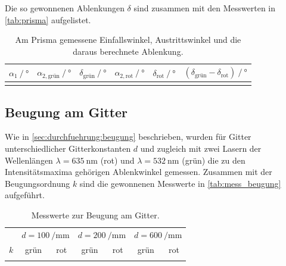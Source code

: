 Die so gewonnenen Ablenkungen $\delta$ sind zusammen mit den Messwerten in \autoref{tab:prisma} aufgelistet.

\begin{table}
  \centering
  \caption{Am Prisma gemessene Einfallswinkel, Austrittswinkel und die daraus berechnete Ablenkung.} %
  \label{tab:prisma}
  \begin{tabular}{S S S S S S}
    \toprule
    {$\alpha_1 \mathbin{/} \si{\degree}$} &
    {$\alpha_{2, \text{grün}} \mathbin{/} \si{\degree}$} &
    {$\delta_\text{grün} \mathbin{/} \si{\degree}$} &
    {$\alpha_{2, \text{rot}} \mathbin{/} \si{\degree}$} &
    {$\delta_\text{rot} \mathbin{/} \si{\degree}$} &
    {$(\delta_\text{grün} - \delta_\text{rot}) \mathbin{/} \si{\degree}$} \\
    \midrule
    \bottomrule
  \end{tabular}
\end{table}


\FloatBarrier %
\subsection{Beugung am Gitter}
\label{sec:auswertung:beugung}
Wie in \autoref{sec:durchfuehrung:beugung} beschrieben,
wurden für Gitter unterschiedlicher Gitterkonstanten $d$
und zugleich mit zwei Lasern der Wellenlängen
$\lambda = \SI{635}{\nano\meter}$ (rot) und
$\lambda = \SI{532}{\nano\meter}$ (grün)
die zu den Intensitätsmaxima gehörigen Ablenkwinkel gemessen.
Zusammen mit der Beugungsordnung $k$ sind die gewonnenen Messwerte
in \autoref{tab:mess_beugung} aufgeführt.

\begin{table}
  \centering
  \caption{Messwerte zur Beugung am Gitter.}
  \label{tab:mess_beugung}
  \begin{tabular}{S S S S S S S}
    \toprule
    &
     &
     &
     \\
    \cmidrule(lr){2-3}
    \cmidrule(lr){4-5}
    \cmidrule(lr){6-7}
    {$k$} &
    {grün} &
    {rot} &
    {grün} &
    {rot} &
    {grün} &
    {rot} \\
    \midrule
    \bottomrule
  \end{tabular}
\end{table}

